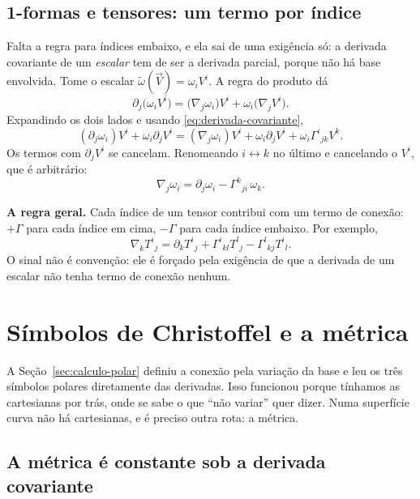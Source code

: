 \documentclass[12pt,a4paper,oneside]{book}
\theoremstyle{rgplain}
\theoremstyle{rgremark}
\begin{document}
\subsection*{1-formas e tensores: um termo por índice}

Falta a regra para índices embaixo, e ela sai de uma exigência só: a derivada
covariante de um \emph{escalar} tem de ser a derivada parcial, porque não há
base envolvida. Tome o escalar $\tilde\omega(\vec V)=\omega_iV^i$. A regra do
produto dá
\[
  \partial_j\bigl(\omega_iV^i\bigr)
  =\bigl(\nabla_j\omega_i\bigr)V^i+\omega_i\bigl(\nabla_jV^i\bigr) .
\]
Expandindo os dois lados e usando \eqref{eq:derivada-covariante},
\[
  (\partial_j\omega_i)V^i+\omega_i\partial_jV^i
  =(\nabla_j\omega_i)V^i+\omega_i\partial_jV^i
   +\omega_i\Gamma^i{}_{jk}V^k .
\]
Os termos com $\partial_jV^i$ se cancelam. Renomeando $i\leftrightarrow k$ no
último e cancelando o $V^i$, que é arbitrário:
\begin{equation}
  \nabla_j\omega_i=\partial_j\omega_i-\Gamma^k{}_{ji}\,\omega_k .
  \label{eq:derivada-1forma}
\end{equation}

\begin{central}
\textbf{A regra geral.} Cada índice de um tensor contribui com um termo de
conexão: $+\Gamma$ para cada índice em cima, $-\Gamma$ para cada índice
embaixo. Por exemplo,
\[
  \nabla_k T^i{}_j=\partial_kT^i{}_j
  +\Gamma^i{}_{kl}T^l{}_j
  -\Gamma^l{}_{kj}T^i{}_l .
\]
O sinal não é convenção: ele é forçado pela exigência de que a derivada de um
escalar não tenha termo de conexão nenhum.
\end{central}

\section{Símbolos de Christoffel e a métrica}
\label{sec:geodesica-christoffel}

A Seção~\ref{sec:calculo-polar} definiu a conexão pela variação da base e leu
os três símbolos polares diretamente das derivadas. Isso funcionou porque
tínhamos as cartesianas por trás, onde se sabe o que ``não variar'' quer
dizer. Numa superfície curva não há cartesianas, e é preciso outra rota: a
métrica.

\subsection*{A métrica é constante sob a derivada covariante}
\end{document}

